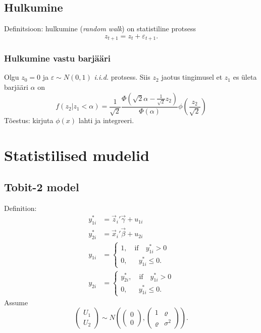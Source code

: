 \documentclass[a4paper]{article}
\newcommand{\iid}{\textit{i.i.d.}\xspace}
\numberwithin{equation}{subsection}
\begin{document}
\subsection{Hulkumine}

Definitsioon: hulkumine (\textit{random walk}) on statistiline
protsess
\begin{equation}
z_{t+1} = z_t + \varepsilon_{t+1}.
\end{equation}


\subsubsection{Hulkumine vastu barjääri}
Olgu $z_0=0$ ja $\varepsilon \sim N(0,1)$ \iid protsess.
Siis $z_2$ jaotus tingimusel et $z_1$ es ületa barjääri $\alpha$ on
\begin{equation}
f(z_2|z_1<\alpha) = 
  \frac{1}{\sqrt{2}}
  \frac{\Phi\left(\sqrt{2}\alpha - 
                  \displaystyle\frac{1}{\sqrt{2}}z_2\right)}
    {\Phi(\alpha)}
  \phi \left( \frac{z_2}{\sqrt{2}} \right)
\end{equation}
Tõestus: kirjuta $\phi(x)$ lahti ja integreeri.


\newpage
\section{Statistilised mudelid}
\subsection{Tobit-2 model}

Definition:
\begin{align}
  y_{1i}^* &= \vec{z}_i' \vec{\gamma} + u_{1i}
  \\
  y_{2i}^* &= \vec{x}_i' \vec{\beta} + u_{2i}
  \\
  y_{1i} &=
  \begin{cases}
    1, \quad \text{if} \quad y_{1i}^* > 0\\
    0, \quad \phantom{\text{if}} y_{1i}^* \le 0.
  \end{cases}
  \\
  y_{2i} &=
  \begin{cases}
    y_{2i}^*, \quad \text{if} \quad y_{1i}^* > 0\\
    0, \quad \phantom{\text{if}} y_{1i}^* \le 0.
  \end{cases}
\end{align}
Assume
\begin{equation}
  \begin{pmatrix}
    U_{1}\\
    U_{2}
  \end{pmatrix}
 \sim 
 N \left( 
   \begin{pmatrix}
     0 \\ 0
   \end{pmatrix},
  \begin{pmatrix}
  1             & \varrho \\
  \varrho       & \sigma^2
  \end{pmatrix}
\right).
\end{equation}
\end{document}
